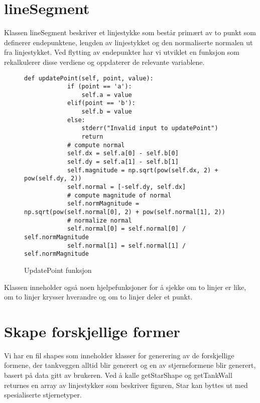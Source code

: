 \section{lineSegment}
Klassen lineSegment beskriver et linjestykke som består primært av to punkt som definerer endepunktene, lengden av linjestykket og den normaliserte normalen ut fra linjestykket. Ved flytting av endepunkter har vi utviklet en funksjon som rekalkulerer disse verdiene og oppdaterer de relevante variablene.
\begin{figure}[h]
    \centering
    \lstset{language=Python, breaklines=true,} 
    \begin{lstlisting}[frame=single]  
        def updatePoint(self, point, value):
            if (point == 'a'):
                self.a = value
            elif(point == 'b'):
                self.b = value
            else:
                stderr("Invalid input to updatePoint")
                return
            # compute normal
            self.dx = self.a[0] - self.b[0]
            self.dy = self.a[1] - self.b[1]
            self.magnitude = np.sqrt(pow(self.dx, 2) + pow(self.dy, 2))
            self.normal = [-self.dy, self.dx]
            # compute magnitude of normal
            self.normMagnitude = np.sqrt(pow(self.normal[0], 2) + pow(self.normal[1], 2))
            # normalize normal
            self.normal[0] = self.normal[0] / self.normMagnitude
            self.normal[1] = self.normal[1] / self.normMagnitude

\end{lstlisting}
    \caption{UpdatePoint funksjon}
    \label{fig:my_label}
\end{figure}


 Klassen inneholder også noen hjelpefunksjoner for å sjekke om to linjer er like, om to linjer krysser hverandre og om to linjer deler et punkt.
  \clearpage
 \section{Skape forskjellige former}
 Vi har en fil shapes som inneholder klasser for generering av de forskjellige formene, der tankveggen alltid blir generert og en av stjerneformene blir generert, basert på data gitt av brukeren. Ved å kalle getStarShape og getTankWall returnes en array av linjestykker som beskriver figuren, Star kan byttes ut med spesialiserte stjernetyper. 

